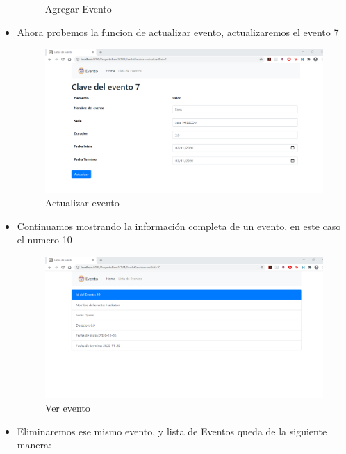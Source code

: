 \documentclass[10pt,a4paper]{article}
\begin{document}
\begin{itemize}
\begin{figure}[H]
    	\centering \linebreak \linebreak 
    	\caption{Agregar Evento}
    	\label{img:Add}
    \end{figure}  \hfill
    \item Ahora probemos la funcion de actualizar evento, actualizaremos el evento 7
        \begin{figure}[H]
    	\includegraphics[scale=0.5]{images/actualizarEvento.png}
    	\centering \linebreak \linebreak 
    	\caption{Actualizar evento}
    	\label{img:update}
    \end{figure}  \hfill
    \item Continuamos mostrando la información completa de un evento, en este caso el numero 10
        \begin{figure}[H]
    	\includegraphics[scale=0.5]{images/verEvento.png}
    	\centering \linebreak \linebreak 
    	\caption{Ver evento}
    	\label{img:read}
    \end{figure}  \hfill
    \item Eliminaremos ese mismo evento, y lista de Eventos queda de la siguiente manera:

\end{itemize}
\end{document}
